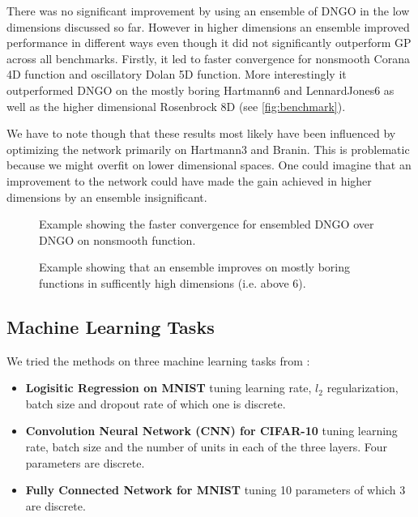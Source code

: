 \documentclass[conference,compsoc]{IEEEtran}
\theoremstyle{definition}
\begin{document}
        There was no significant improvement by using an ensemble of DNGO in the low dimensions discussed so far.
        However in higher dimensions an ensemble improved performance in different ways even though it did not significantly outperform GP across all benchmarks.
        Firstly, it led to faster convergence for nonsmooth Corana 4D function and oscillatory Dolan 5D function.
        More interestingly it outperformed DNGO on the mostly boring Hartmann6 and LennardJones6 as well as the higher dimensional Rosenbrock 8D (see \cref{fig:benchmark}).

        We have to note though that these results most likely have been influenced by optimizing the network primarily on Hartmann3 and Branin.
        This is problematic because we might overfit on lower dimensional spaces.
        One could imagine that an improvement to the network could have made the gain achieved in higher dimensions by an ensemble insignificant.

        \begin{figure*}[t]
            \centering
            \begin{subfigure}[t]{0.45\textwidth}
                \centering
                
            \caption{Example showing the faster convergence for ensembled DNGO over DNGO on nonsmooth function.}
            \end{subfigure}\qquad
            \begin{subfigure}[t]{0.45\textwidth}
                \centering
                
                \caption{Example showing that an ensemble improves on mostly boring functions in sufficently high dimensions (i.e. above 6).}
            \end{subfigure}
            \caption{Both plots shows the average Simple Regret over 10 runs with a $1/4$ standard derivation confidence interval.}
            \label{fig:benchmark}
        \end{figure*}

    \subsection{Machine Learning Tasks}\label{sec:highdim}

        We tried the methods on three machine learning tasks from \parencite{eggensperger_hpolib2_2018}:
        
            \begin{itemize}
                \item \textbf{Logisitic Regression on MNIST} tuning learning rate, $l_2$ regularization, batch size and dropout rate of which one is discrete. 
                \item \textbf{Convolution Neural Network (CNN) for CIFAR-10} tuning learning rate, batch size and the number of units in each of the three layers. Four parameters are discrete.
                \item \textbf{Fully Connected Network for MNIST} tuning 10 parameters of which 3 are discrete.
            \end{itemize}
        
\end{document}

